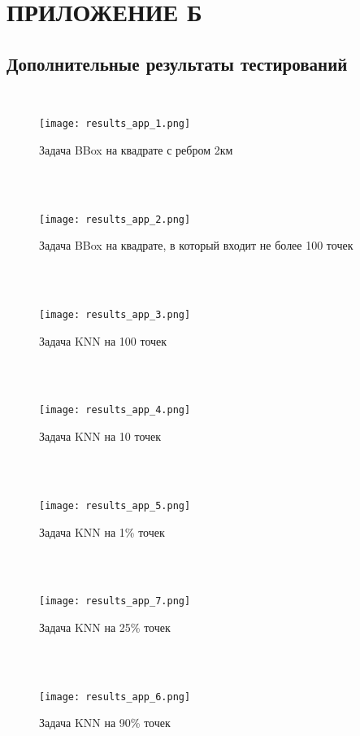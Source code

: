 \chapter{ПРИЛОЖЕНИЕ Б}
\section{Дополнительные результаты тестирований}
  \\
\begin{figure}[h]
    \centering
    \texttt{[image: results\_app\_1.png]}
    \caption{Задача BBox на квадрате с ребром 2км}
\end{figure}
  \\
    \\
\begin{figure}[h]
    \centering
    \texttt{[image: results\_app\_2.png]}
    \caption{Задача BBox на квадрате, в который входит не более 100 точек}
\end{figure}
  \\
    \\
\begin{figure}[h]
    \centering
    \texttt{[image: results\_app\_3.png]}
    \caption{Задача KNN на 100 точек}
\end{figure}
  \\
    \\
\begin{figure}[h]
    \centering
    \texttt{[image: results\_app\_4.png]}
    \caption{Задача KNN на 10 точек}
\end{figure}
  \\
    \\
\begin{figure}[h]
    \centering
    \texttt{[image: results\_app\_5.png]}
    \caption{Задача KNN на 1\% точек}
\end{figure}
  \\
    \\
\begin{figure}[h]
    \centering
    \texttt{[image: results\_app\_7.png]}
    \caption{Задача KNN на 25\% точек}
\end{figure}
  \\
    \\
\begin{figure}[h]
    \centering
    \texttt{[image: results\_app\_6.png]}
    \caption{Задача KNN на 90\% точек}
\end{figure}
  \\

